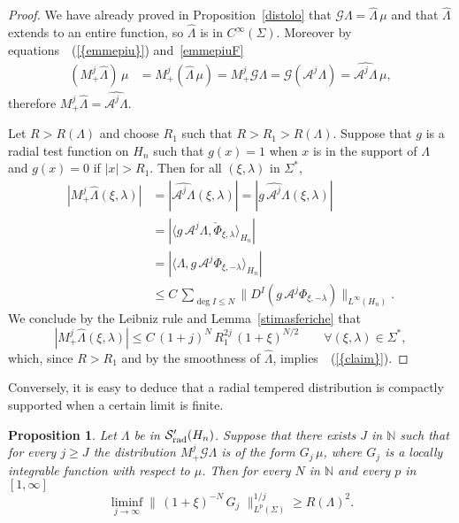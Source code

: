 \documentclass[12pt,a4paper]{amsart}
\theoremstyle{plain}
\newtheorem{proposition}[theorem]{Proposition}
\theoremstyle{definition}
\numberwithin{equation}{section}
\begin{document}
\begin{proof} We have already proved in Proposition~\ref{distolo}
that ${\mathcal G}\Lambda=\widehat\Lambda\, \mu$
and that $\widehat\Lambda$ extends to an entire function, so 
$\widehat\Lambda$ is in  $C^\infty({\Sigma})$.
Moreover by equations~{~(\ref{{emmepiu}})}
and~\eqref{emmepiuF}
\begin{align*}
(M_+^j\widehat\Lambda)\, \mu
&=M_+^j(\widehat\Lambda\, \mu) 
=M_+^j{\mathcal G}\Lambda 
={\mathcal G}({{\mathcal A}^j \Lambda}) 
=\widehat{{\mathcal A}^j \Lambda}\,\mu,
\end{align*}
therefore $M_+^j\widehat\Lambda=\widehat{{\mathcal A}^j \Lambda}$.

Let
 $R>R(\Lambda)$ and choose $R_1$ such that $R>R_1>R(\Lambda)$. 
Suppose 
that $g$ is a radial test function on ${{H_{n}}}$ such that $g(x)=1$
when $x$ is in the support of $\Lambda$ and $g(x)=0$ if $|x|> R_1$.
Then for all $(\xi,{\lambda})$ in ${{\Sigma^*}}$,
\begin{align*}
|M_+^j \widehat \Lambda(\xi,{\lambda})|
&=| \widehat {{\mathcal A}^j \Lambda}(\xi,{\lambda})|
=| \widehat {g\,{\mathcal A}^j\Lambda}(\xi,{\lambda})|
\\
&=|{\langle {g\,{\mathcal A}^j\Lambda},{\check{\Phi}_{\xi,{\lambda}}} \rangle_{{H_{n}}}} |
\\
&=| {\langle {\Lambda},{g\,{\mathcal A}^j\Phi_{\xi,-{\lambda}}} \rangle_{{H_{n}}}} |
\\
&\leq C\, \sum_{\deg I\leq N} 
\| {{D}}^I (g\,{\mathcal A}^j\Phi_{\xi,-{\lambda}})\|_{L^\infty({{H_{n}}})}.
\end{align*}
We conclude 
by the Leibniz rule
and Lemma~\ref{stimasferiche} that
$$
|M_+^j \widehat \Lambda(\xi,{\lambda})|\leq C\, (1+j)^N\, R_1^{2j}\, (1+\xi)^{N/2}
\qquad
\forall (\xi,{\lambda})\in{{\Sigma^*}},
$$
which, since $R>R_1$ and by the smoothness of $\widehat\Lambda$, implies~{~(\ref{{claim}})}.
\end{proof}

\bigskip
Conversely, it is easy to deduce that a radial tempered distribution is compactly
supported
when a certain limit is finite.
\begin{proposition}
\label{due}
Let $\Lambda$ be in ${{\mathcal S}'_{\text{\rm rad}}({{H_{n}}})}$.   
Suppose that there exists  $J$ in ${\mathbb N}$ such that
  for every 
 $j\geq J$ the distribution $ M_+^j{\mathcal G} \Lambda$ is of the form $G_j\,\mu $, where $G_j$ is 
 a locally integrable function with respect to $\mu$. Then for every $N$ in ${\mathbb N}$
and every $p$ in $[1,\infty]$
$$
\liminf_{j\to\infty} 
\|\,(1+\xi)^{-N
}\, G_j\,\,\|_{L^p({\Sigma})}^{1/j}
\geq R(\Lambda)^2.
$$ 
\end{proposition}
 
\end{document}
